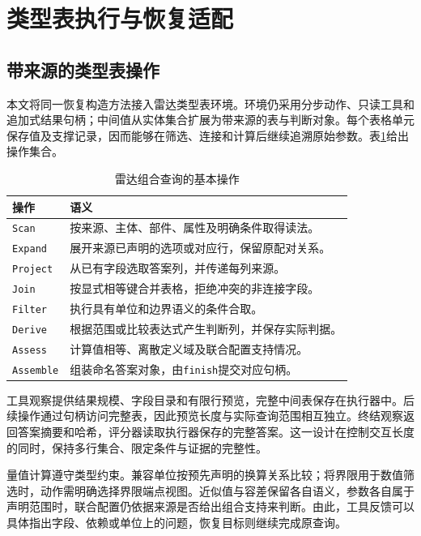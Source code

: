 \section{类型表执行与恢复适配}
\label{sec:domain-execution}

\subsection{带来源的类型表操作}

本文将同一恢复构造方法接入雷达类型表环境。环境仍采用分步动作、只读工具和追加式结果句柄；中间值从实体集合扩展为带来源的表与判断对象。每个表格单元保存值及支撑记录，因而能够在筛选、连接和计算后继续追溯原始参数。表\ref{tab:domain-operations}给出操作集合。

\begin{table}[htbp]
\centering\small
\caption{雷达组合查询的基本操作}
\label{tab:domain-operations}
\begin{tabular}{lp{10cm}}
\toprule
操作 & 语义 \\
\midrule
\texttt{Scan} & 按来源、主体、部件、属性及明确条件取得读法。\\
\texttt{Expand} & 展开来源已声明的选项或对应行，保留原配对关系。\\
\texttt{Project} & 从已有字段选取答案列，并传递每列来源。\\
\texttt{Join} & 按显式相等键合并表格，拒绝冲突的非连接字段。\\
\texttt{Filter} & 执行具有单位和边界语义的条件合取。\\
\texttt{Derive} & 根据范围或比较表达式产生判断列，并保存实际判据。\\
\texttt{Assess} & 计算值相等、离散定义域及联合配置支持情况。\\
\texttt{Assemble} & 组装命名答案对象，由\texttt{finish}提交对应句柄。\\
\bottomrule
\end{tabular}
\end{table}

工具观察提供结果规模、字段目录和有限行预览，完整中间表保存在执行器中。后续操作通过句柄访问完整表，因此预览长度与实际查询范围相互独立。终结观察返回答案摘要和哈希，评分器读取执行器保存的完整答案。这一设计在控制交互长度的同时，保持多行集合、限定条件与证据的完整性。

量值计算遵守类型约束。兼容单位按预先声明的换算关系比较；将界限用于数值筛选时，动作需明确选择界限端点视图。近似值与容差保留各自语义，参数各自属于声明范围时，联合配置仍依据来源是否给出组合支持来判断。由此，工具反馈可以具体指出字段、依赖或单位上的问题，恢复目标则继续完成原查询。

